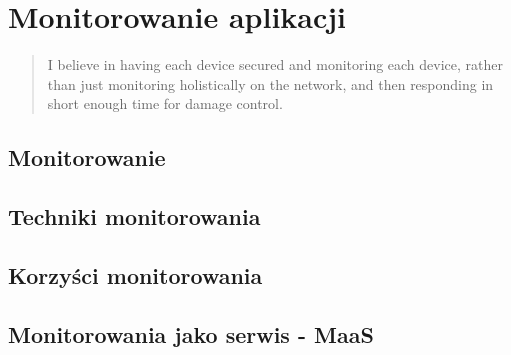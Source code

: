 \chapter[Monitorowania aplikacji]{Monitorowanie aplikacji}
\label{chapter:monitoring}

\begin{quote}
    I believe in having each device secured and monitoring each device, rather than just
    monitoring holistically on the network, and then responding in short enough time for damage control.
\end{quote}

\section{Monitorowanie}
\section{Techniki monitorowania}
\section{Korzyści monitorowania}
\section{Monitorowania jako serwis - MaaS}